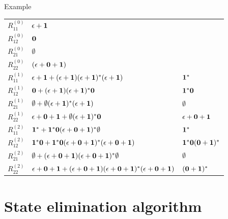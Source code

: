 \documentclass[handout]{beamer}
\begin{document}
\begin{frame}{Example}
    \begin{center}\footnotesize
        \begin{tabular}{r | l @{=} l}
        $R_{11}^{(0)}$ & $\epsilon +{\bf 1}$ &\\
        $R_{12}^{(0)}$ & ${\bf 0}$&\\ 
        $R_{21}^{(0)}$ & $\emptyset$&\\
        $R_{22}^{(0)}$ & $(\epsilon +{\bf 0}+{\bf 1})$&\\
        \hline
        $R_{11}^{(1)}$ & $\epsilon +{\bf 1}+(\epsilon +{\bf 1})(\epsilon +{\bf 1})^*(\epsilon +{\bf 1})$ & ${\bf 1}^*$\\
        $R_{12}^{(1)}$ & ${\bf 0} +(\epsilon +{\bf 1})(\epsilon +{\bf 1})^*{\bf 0}$ &  ${\bf 1}^*{\bf 0}$\\
        $R_{21}^{(1)}$ & $\emptyset +\emptyset(\epsilon +{\bf 1})^*(\epsilon +{\bf 1})$&$\emptyset$\\
        $R_{22}^{(1)}$ & $\epsilon+{\bf 0} +{\bf 1}+\emptyset(\epsilon +{\bf 1})^*{\bf 0}$&$\epsilon+{\bf 0}+{\bf 1}$\\ 
        \hline
        $R_{11}^{(2)}$ & ${\bf 1}^*+{\bf 1}^*{\bf 0}(\epsilon +{\bf 0}+{\bf 1})^*\emptyset$ & ${\bf 1}^*$\\
        $R_{12}^{(2)}$ & ${\bf 1}^*{\bf 0}+{\bf 1}^*{\bf 0}(\epsilon +{\bf 0}+{\bf 1})^*(\epsilon +{\bf 0}+{\bf 1})$ & ${\bf 1}^*{\bf 0}({\bf 0}+{\bf 1})^*$\\
        $R_{21}^{(2)}$ & $\emptyset+(\epsilon +{\bf 0}+{\bf 1})(\epsilon +{\bf 0}+{\bf 1})^*\emptyset$ & $\emptyset$\\
        $R_{22}^{(2)}$ & $\epsilon+{\bf 0}+{\bf 1}+(\epsilon +{\bf 0}+{\bf 1})(\epsilon +{\bf 0}+{\bf 1})^*(\epsilon +{\bf 0}+{\bf 1})$ & $({\bf 0}+{\bf 1})^*$
        \end{tabular}
    \end{center}

\end{frame}


\section*{State elimination algorithm}
\end{document}
